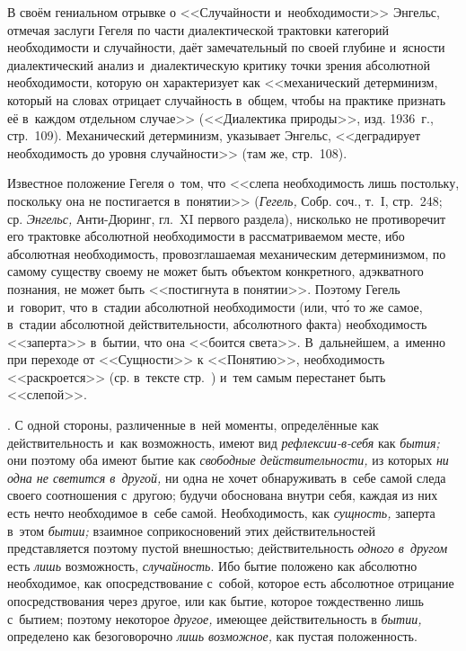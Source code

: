 {В своём гениальном отрывке о <<Случайности и~необходимости>> Энгельс, отмечая
заслуги Гегеля по части диалектической трактовки категорий необходимости и
случайности, даёт замечательный по своей глубине и~ясности диалектический
анализ и~диалектическую критику точки зрения абсолютной необходимости,
которую он характеризует как <<механический детерминизм, который на словах
отрицает случайность в~общем, чтобы на практике признать её в~каждом
отдельном случае>> (<<Диалектика природы>>, изд. 1936~г., стр.~109).
Механический детерминизм, указывает Энгельс, <<деградирует необходимость до
уровня случайности>> (там же, стр.~108).

Известное положение Гегеля о~том, что <<слепа необходимость лишь постольку,
поскольку она не постигается в~понятии>> ({\em Гегель,} Собр. соч., т.~I,
стр.~248; ср. {\em Энгельс,} Анти-Дюринг, гл.~XI первого раздела),
нисколько не противоречит его трактовке абсолютной необходимости в
рассматриваемом месте, ибо абсолютная необходимость, провозглашаемая
механическим детерминизмом, по самому существу своему не может быть
объектом конкретного, адэкватного познания, не может быть <<постигнута в
понятии>>. Поэтому Гегель и~говорит, что в~стадии абсолютной необходимости
(или, чт\'{о} то же самое, в~стадии абсолютной действительности, абсолютного
факта) необходимость <<заперта>> в~бытии, что она <<боится света>>.
В~дальнейшем, а~именно при переходе от <<Сущности>> к <<Понятию>>,
необходимость <<раскроется>> (ср. в~тексте стр.~\pageref{bkm:bm93a}) и~тем
самым перестанет быть <<слепой>>.}.
С одной стороны, различенные в~ней моменты, определённые как
действительность и~как возможность, имеют вид
{\em рефлексии-в-себя} как {\em бытия;} они поэтому оба имеют бытие как
{\em свободные действительности,} из которых
{\em ни одна не светится в~другой,} ни одна не хочет
обнаруживать в~себе самой следа своего соотношения с~другою; будучи
обоснована внутри себя, каждая из них есть нечто необходимое в~себе самой.
Необходимость, как {\em сущность,} заперта в~этом
{\em бытии;} взаимное соприкосновений этих
действительностей представляется поэтому пустой внешностью;
действительность {\em одного в~другом} есть {\em лишь} возможность,
{\em случайность}. Ибо бытие положено как абсолютно
необходимое, как опосредствование с~собой, которое есть абсолютное
отрицание опосредствования через другое, или как бытие, которое
тождественно лишь с~бытием; поэтому некоторое
{\em другое,} имеющее действительность в
{\em бытии,} определено как безоговорочно
{\em лишь возможное,} как пустая положенность.

